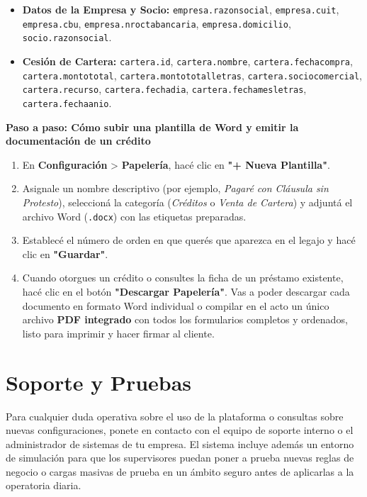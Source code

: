 \documentclass[12pt,a4paper]{article}
\renewcommand{\_}{\textunderscore\allowbreak}
\begin{document}
\begin{itemize}
    \item \textbf{Datos de la Empresa y Socio:} \texttt{empresa.razon\_social}, \texttt{empresa.cuit}, \texttt{empresa.cbu}, \texttt{empresa.nro\_cta\_bancaria}, \texttt{empresa.domicilio}, \texttt{socio.razon\_social}.
    \item \textbf{Cesión de Cartera:} \texttt{cartera.id}, \texttt{cartera.nombre}, \texttt{cartera.fecha\_compra}, \texttt{cartera.monto\_total}, \texttt{cartera.monto\_total\_letras}, \texttt{cartera.socio\_comercial}, \texttt{cartera.recurso}, \texttt{cartera.fecha\_dia}, \texttt{cartera.fecha\_mes\_letras}, \texttt{cartera.fecha\_anio}.
\end{itemize}

\textbf{Paso a paso: Cómo subir una plantilla de Word y emitir la documentación de un crédito}
\begin{enumerate}
    \item En \textbf{Configuración} > \textbf{Papelería}, hacé clic en \textbf{"+ Nueva Plantilla"}.
    \item Asignale un nombre descriptivo (por ejemplo, \textit{Pagaré con Cláusula sin Protesto}), seleccioná la categoría (\textit{Créditos} o \textit{Venta de Cartera}) y adjuntá el archivo Word (\texttt{.docx}) con las etiquetas preparadas.
    \item Establecé el número de orden en que querés que aparezca en el legajo y hacé clic en \textbf{"Guardar"}.
    \item Cuando otorgues un crédito o consultes la ficha de un préstamo existente, hacé clic en el botón \textbf{"Descargar Papelería"}. Vas a poder descargar cada documento en formato Word individual o compilar en el acto un único archivo \textbf{PDF integrado} con todos los formularios completos y ordenados, listo para imprimir y hacer firmar al cliente.
\end{enumerate}

\section{Soporte y Pruebas}
Para cualquier duda operativa sobre el uso de la plataforma o consultas sobre nuevas configuraciones, ponete en contacto con el equipo de soporte interno o el administrador de sistemas de tu empresa. El sistema incluye además un entorno de simulación para que los supervisores puedan poner a prueba nuevas reglas de negocio o cargas masivas de prueba en un ámbito seguro antes de aplicarlas a la operatoria diaria.
\end{document}
